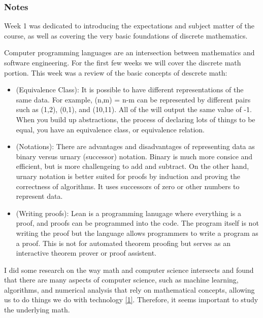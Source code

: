 \documentclass{article}
\theoremstyle{theorem}
\theoremstyle{definition}
\theoremstyle{remark}
\begin{document}
\subsubsection{Notes}

Week 1 was dedicated to introducing the expectations and subject matter of the course, as well as covering the very basic foundations of discrete mathematics.

\hspace{0.65cm}Computer programming languages are an intersection between mathematics
and software engineering. For the first few weeks we will cover the discrete math portion. 
This week was a review of the basic concepts of descrete math:

\begin{itemize}
\item(Equivalence Class): It is possible to have different representations of the same data.
For example, (n,m) = n-m can be represented by different pairs such as (1,2), (0,1), and (10,11). All of the will output the same value of -1.
When you build up abstractions, the process of declaring lots of things to be equal, you have an equivalence class, or equivalence relation.

\item(Notations): There are advantages and disadvantages of representing data as binary versus urnary (successor) notation.
Binary is much more consice and efficient, but is more challengeing to add and subtract. On the other hand, urnary notation
is better suited for proofs by induction and proving the correctness of algorithms. It uses successors of zero or other numbers to 
represent data.

\item(Writing proofs): Lean is a programming lanugage where everything is a proof, and proofs can be programmed into the code. 
The program itself is not writing the proof but the language allows programmers to write a program as a proof. This is not for automated 
theorem proofing but serves as an interactive theorem prover or proof assistent.
\\
\end{itemize}

\hspace{0.65cm}I did some research on the way math and computer science intersects and found that there are many aspects of computer science, such as machine learning, algorithms, and numerical analysis that rely on mathematical concepts, 
allowing us to do things we do with technology \hyperref[1]{[1]}. Therefore, it seems important to study the underlying math. 
\end{document}
